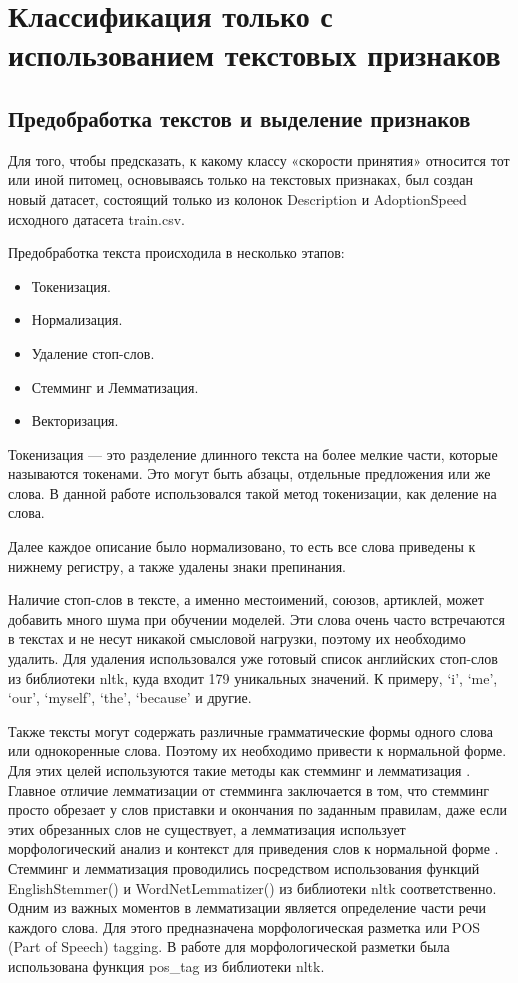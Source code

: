 \documentclass[14pt]{mmcs_article}
\begin{document}
\newpage
\section{Классификация только с использованием \mbox{текстовых} признаков}

\subsection{Предобработка текстов и выделение \mbox{признаков}}

Для того, чтобы предсказать, к какому классу «скорости принятия» относится тот или иной питомец, основываясь только на текстовых признаках, был создан новый датасет, состоящий только из колонок Description и AdoptionSpeed исходного датасета train.csv.

Предобработка текста происходила в несколько этапов:

\begin{itemize}
	\item Токенизация.
	\item Нормализация.
	\item Удаление стоп-слов.
	\item Стемминг и Лемматизация.
	\item Векторизация.
\end{itemize}

Токенизация --- это разделение длинного текста на более мелкие части, которые называются токенами. Это могут быть абзацы, отдельные предложения или же слова. В данной работе использовался такой метод токенизации, как деление на слова.
 
Далее каждое описание было нормализовано, то есть все слова приведены к нижнему регистру, а также удалены знаки препинания. 

Наличие стоп-слов в тексте, а именно местоимений, союзов, артиклей, может добавить много шума при обучении моделей. Эти слова очень часто встречаются в текстах и не несут никакой смысловой нагрузки, поэтому их необходимо удалить. Для удаления использовался уже готовый список английских стоп-слов из библиотеки nltk, куда входит 179 уникальных значений. К примеру, `i', `me', `our', `myself', `the', `because' и другие. 

Также тексты могут содержать различные грамматические формы одного слова или однокоренные слова. Поэтому их необходимо привести к нормальной форме. Для этих целей используются такие методы как стемминг и лемматизация \cite{lib:stemlem}. Главное отличие лемматизации от стемминга заключается в том, что стемминг просто обрезает у слов приставки и окончания по заданным правилам, даже если этих обрезанных слов не существует, а лемматизация использует морфологический анализ и контекст для приведения слов к нормальной форме \cite{lib:langproc}. Стемминг и лемматизация проводились посредством использования функций EnglishStemmer() и WordNetLemmatizer() из библиотеки nltk соответственно. Одним из важных моментов в лемматизации является определение части речи каждого слова. Для этого предназначена морфологическая разметка или POS (Part of Speech) tagging. В работе для морфологической разметки была использована функция pos\_tag из библиотеки nltk.
\end{document}
